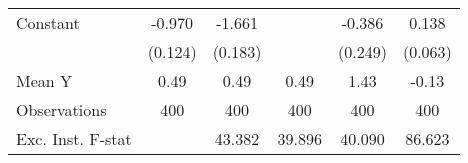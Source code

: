 {\begin{tabular}{l*{5}{c}}
\addlinespace
Constant            &      -0.970\sym{***}&      -1.661\sym{***}&                     &      -0.386         &       0.138\sym{**} \\
                    &     (0.124)         &     (0.183)         &                     &     (0.249)         &     (0.063)         \\
\midrule
Mean Y              &        0.49         &        0.49         &        0.49         &        1.43         &       -0.13         \\
Observations        &         400         &         400         &         400         &         400         &         400         \\
Exc. Inst. F-stat   &                     &      43.382         &      39.896         &      40.090         &      86.623         \\
\bottomrule
\end{tabular}
}
